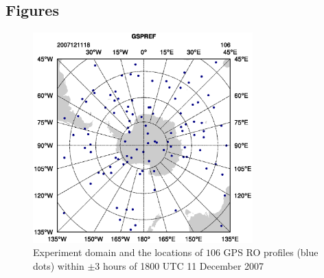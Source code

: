 \documentclass[12pt]{article}
\begin{document}
\subsection{Figures}

\begin{figure}
\noindent\includegraphics[width=20pc]{figures/obsloc2007121118.eps}
\caption{Experiment domain and the locations of $106$ GPS RO profiles (blue dots) within $\pm3$ hours of 1800 UTC 11 December 2007}
\label{domain}
\end{figure}
%
\end{document}
